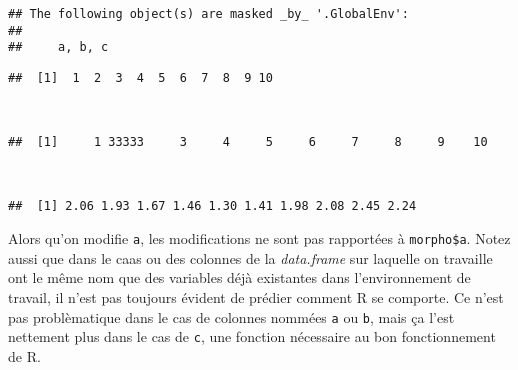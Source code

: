 \begin{knitrout}
\color{fgcolor}\begin{kframe}
\begin{flushleft}
\ttfamily\noindent
{}\hlkeyword{(}\hlkeyword{)}\mbox{}
\normalfont
\end{flushleft}
\begin{verbatim}
## The following object(s) are masked _by_ '.GlobalEnv':
## 
##     a, b, c
\end{verbatim}
\begin{flushleft}
\ttfamily\noindent
{}\hlkeyword{[}\hlkeyword{(}\hlkeyword{:}\hlkeyword{)}\hlkeyword{]}\mbox{}
\normalfont
\end{flushleft}
\begin{verbatim}
##  [1]  1  2  3  4  5  6  7  8  9 10
\end{verbatim}
\begin{flushleft}
\ttfamily\noindent
{}\hlkeyword{[}\hlkeyword{]}{\ }\hlassignement{\usebox{\hlnormalsizeboxlessthan}-}{\ }\hspace*{\fill}\\
\hlstd{}\hlkeyword{[}\hlkeyword{(}\hlkeyword{:}\hlkeyword{)}\hlkeyword{]}\mbox{}
\normalfont
\end{flushleft}
\begin{verbatim}
##  [1]     1 33333     3     4     5     6     7     8     9    10
\end{verbatim}
\begin{flushleft}
\ttfamily\noindent
{}\hlkeyword{(}\hlkeyword{)}\hspace*{\fill}\\
\hlstd{}\hlkeyword{\usebox{\hlnormalsizeboxdollar}}\hlkeyword{[}\hlkeyword{(}\hlkeyword{:}\hlkeyword{)}\hlkeyword{]}\mbox{}
\normalfont
\end{flushleft}
\begin{verbatim}
##  [1] 2.06 1.93 1.67 1.46 1.30 1.41 1.98 2.08 2.45 2.24
\end{verbatim}
\end{kframe}
\end{knitrout}


\noindent Alors qu'on modifie \texttt{a}, les modifications ne sont pas rapportées à \texttt{morpho\$a}.
Notez aussi que dans le caas ou des colonnes de la \emph{data.frame} sur laquelle on travaille ont le même nom que des variables déjà existantes dans l'environnement de travail, il n'est pas toujours évident de prédier comment R se comporte.
Ce n'est pas problèmatique dans le cas de colonnes nommées \texttt{a} ou \texttt{b}, mais ça l'est nettement plus dans le cas de \texttt{c}, une fonction nécessaire au bon fonctionnement de R.

